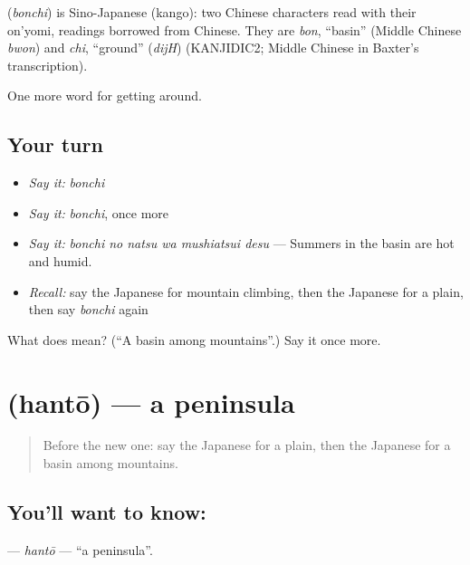 \begin{cousinweb}
\textbf{} (\emph{bonchi}) is Sino-Japanese (kango): two Chinese characters read with their on'yomi, readings borrowed from Chinese. They are \emph{bon}, \textquotedblleft{}basin\textquotedblright{} (Middle Chinese \emph{bwon}) and \emph{chi}, \textquotedblleft{}ground\textquotedblright{} (\emph{dijH}) (KANJIDIC2; Middle Chinese in Baxter's transcription).
\end{cousinweb}

\begin{grammarlens}[title={What you've built}]
One more word for getting around.
\end{grammarlens}

\subsection*{Your turn}
\begin{itemize}
\raggedright
  \item \emph{Say it:} \emph{bonchi}
  \item \emph{Say it:} \emph{bonchi}, once more
  \item \emph{Say it:} \emph{bonchi no natsu wa mushiatsui desu} — Summers in the basin are hot and humid.
  \item \emph{Recall:} say the Japanese for mountain climbing, then the Japanese for a plain, then say \emph{bonchi} again
\end{itemize}

\begin{tcolorbox}[breakable,colback=teal!4,colframe=teal!35!black,title={Before you move on}]
What does  mean? (\textquotedblleft{}A basin among mountains\textquotedblright{}.) Say it once more.
\end{tcolorbox}
\section[\texorpdfstring{\ja{はんとう} (hantō)}{はんとう (hantō)}]{ (hantō) — a peninsula}

\label{lesson:JA-C413-hantou}



\begin{quote}
Before the new one: say the Japanese for a plain, then the Japanese for a basin among mountains.
\end{quote}

\subsection*{You'll want to know: }
\textbf{} — \emph{hantō} — \textquotedblleft{}a peninsula\textquotedblright{}.

